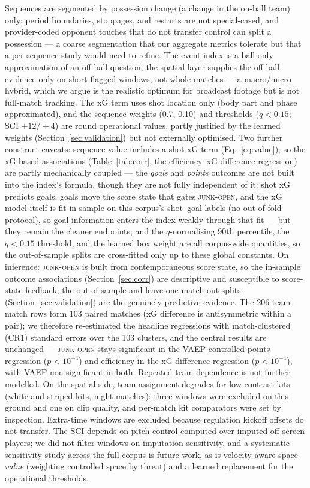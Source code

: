 \documentclass[11pt]{article}
\newcommand{\junk}{\textsc{junk-open}}
\begin{document}
Sequences are segmented by possession change (a change in the on-ball team)
only; period boundaries, stoppages, and restarts are not special-cased, and
provider-coded opponent touches that do not transfer control can split a
possession --- a coarse segmentation that our aggregate metrics tolerate but that
a per-sequence study would need to refine. The event index is a ball-only
approximation of an off-ball question; the spatial layer supplies the off-ball
evidence only on short flagged windows, not whole matches --- a macro/micro hybrid, which we argue is the realistic optimum
for broadcast footage but is not full-match tracking. The xG term uses shot
location only (body part and phase approximated), and the sequence weights
(0.7, 0.10) and thresholds ($q<0.15$; SCI $+12/+4$) are round operational
values, partly justified by the learned weights (Section~\ref{sec:validation})
but not externally optimised. Two further construct caveats: sequence value
includes a shot-xG term (Eq.~\ref{eq:value}), so the xG-based associations
(Table~\ref{tab:corr}, the efficiency--xG-difference regression) are partly
mechanically coupled --- the \emph{goals} and \emph{points} outcomes are not
built into the index's formula, though they are not fully independent of it:
shot xG predicts goals, goals move the score state that gates \junk{}, and the
xG model itself is fit in-sample on this corpus's shot--goal labels (no
out-of-fold protocol), so goal information enters the index weakly through that
fit --- but they remain the cleaner endpoints; and the $q$-normalising
90th percentile, the $q<0.15$ threshold, and the learned box weight are all
corpus-wide quantities, so the out-of-sample splits are cross-fitted only up to
these global constants. On inference: \junk{} is built from
contemporaneous score state, so the in-sample outcome associations
(Section~\ref{sec:corr}) are descriptive and susceptible to score-state
feedback; the out-of-sample and leave-one-match-out splits
(Section~\ref{sec:validation}) are the genuinely predictive evidence. The 206
team-match rows form 103 paired matches (xG difference is antisymmetric within a
pair); we therefore re-estimated the headline regressions with match-clustered
(CR1) standard errors over the 103 clusters, and the central results are
unchanged --- \junk{} stays significant in the VAEP-controlled points regression
($p<10^{-4}$) and efficiency in the xG-difference regression ($p<10^{-4}$), with
VAEP non-significant in both. Repeated-team dependence is not further modelled.
On the spatial side, team assignment degrades for
low-contrast kits (white and striped kits, night matches): three windows were
excluded on this ground and one on clip quality, and per-match kit comparators
were set by inspection. Extra-time windows are excluded because regulation
kickoff offsets do not transfer. The SCI depends on pitch control computed over
imputed off-screen players; we did not filter windows on imputation sensitivity,
and a systematic sensitivity study across the full corpus is future work, as is
velocity-aware space \emph{value} (weighting controlled space by threat) and a
learned replacement for the operational thresholds.
\end{document}

